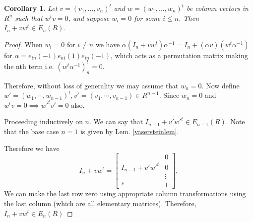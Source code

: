 \documentclass[12pt]{article}
\numberwithin{equation}{section}
\newcounter{dummy} \numberwithin{dummy}{section}
\newtheorem{corollary}[dummy]{Corollary}
\begin{document}
		\begin{corollary}\label{corofvaserstein}
		Let $v = (v_1,\ldots,v_n)^t$ and $w = (w_1,\ldots,w_n)^t$ be column vectors in $R^n$ such that $w^tv = 0$, and suppose $w_i = 0$ for some $i \leq n$. Then $I_n + vw^t \in E_n(R)$.
		\end{corollary}
		\begin{proof}
			When $w_i =0$ for $i \neq n $ we have $\alpha(I_n+vw^t)\alpha^{-1}=I_n+(\alpha v)(w^t\alpha^{-1})$for $\alpha=e_{in}(-1)e_{ni}(1)e_{in}(-1)$, which acts as a permutation matrix making the nth term i.e. $(w^t \alpha^{-1})^t_n=0$.
			
			Therefore, without loss of generality we may assume that $w_n=0$. Now define $w'=(w_1,\cdots, w_{n-1})^t, v'=(v_1, \cdots, v_{n-1}) \in R^{n-1}$. Since $w_n=0$ and $w^tv=0 \implies w'^tv'=0$ also. 
			
			Proceeding inductively on $n$. We can say that $I_{n-1}+v'w'^t \in E_{n-1}(R)$. Note that the base case $n=1$ is given by Lem. \ref{vasersteinlem}.
			
			Therefore we have  \[
			I_n + v w^t = \begin{bmatrix}  & 0 \\ 
			I_{n-1} + v' w'^t	& 0\\
				 & \vdots \\ \hline
				* & 1 \end{bmatrix},
			\]
			We can make the last row zero using appropriate column transformations using the last column (which are all elementary matrices). Therefore, $I_n +vw^t \in E_n(R)$
		\end{proof}
		
\end{document}
